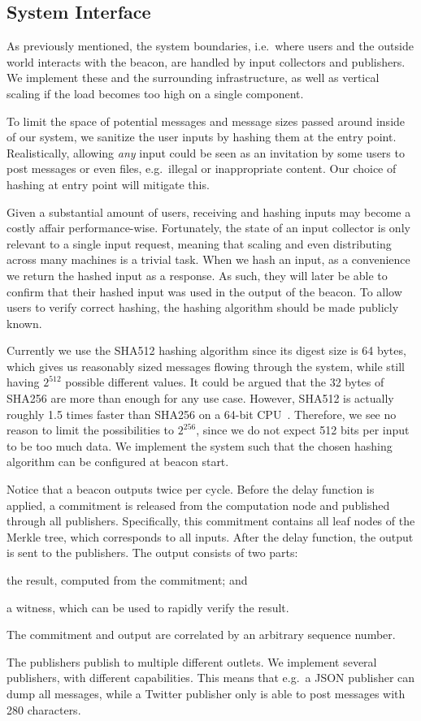 \subsection{System Interface}%
\label{sub:system_interface}
As previously mentioned, the system boundaries, i.e.\ where users and the outside world interacts with the beacon, are handled by input collectors and publishers.
We implement these and the surrounding infrastructure, as well as vertical scaling if the load becomes too high on a single component.

To limit the space of potential messages and message sizes passed around inside of our system, we sanitize the user inputs by hashing them at the entry point.
Realistically, allowing \emph{any} input could be seen as an invitation by some users to post messages or even files, e.g.\ illegal or inappropriate content.
Our choice of hashing at entry point will mitigate this.

Given a substantial amount of users, receiving and hashing inputs may become a costly affair performance-wise.
Fortunately, the state of an input collector is only relevant to a single input request, meaning that scaling and even distributing across many machines is a trivial task.
When we hash an input, as a convenience we return the hashed input as a response.
As such, they will later be able to confirm that their hashed input was used in the output of the beacon.
To allow users to verify correct hashing, the hashing algorithm should be made publicly known.

Currently we use the SHA512 hashing algorithm since its digest size is 64 bytes, which gives us reasonably sized messages flowing through the system, while still having $2^{512}$ possible different values.
It could be argued that the 32 bytes of SHA256 are more than enough for any use case.
However, SHA512 is actually roughly 1.5 times faster than SHA256 on a 64-bit CPU~\cite{sha512faster}.
Therefore, we see no reason to limit the possibilities to $2^{256}$, since we do not expect 512 bits per input to be too much data.
We implement the system such that the chosen hashing algorithm can be configured at beacon start.

Notice that a beacon outputs twice per cycle.
Before the delay function is applied, a commitment is released from the computation node and published through all publishers.
Specifically, this commitment contains all leaf nodes of the Merkle tree, which corresponds to all inputs.
After the delay function, the output is sent to the publishers.
The output consists of two parts:
\begin{eletterate*}
    \item the result, computed from the commitment; and
    \item a witness, which can be used to rapidly verify the result.
\end{eletterate*}
The commitment and output are correlated by an arbitrary sequence number.

The publishers publish to multiple different outlets.
We implement several publishers, with different capabilities.
This means that e.g.\ a JSON publisher can dump all messages, while a Twitter publisher only is able to post messages with 280 characters.
